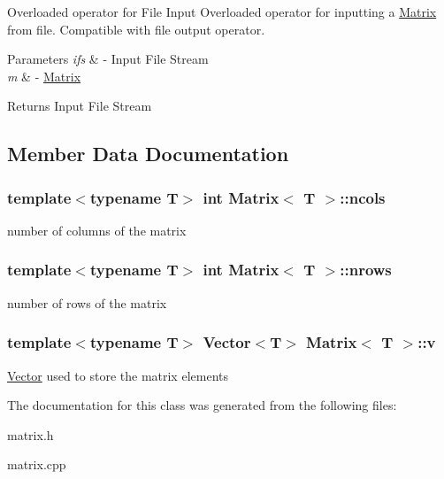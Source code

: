 Overloaded operator for File Input Overloaded operator for inputting a \hyperlink{class_matrix}{Matrix} from file. Compatible with file output operator. 


\begin{DoxyParams}{Parameters}
{\em ifs} & -\/ Input File Stream \\
\hline
{\em m} & -\/ \hyperlink{class_matrix}{Matrix} \\
\hline
\end{DoxyParams}
\begin{DoxyReturn}{Returns}
Input File Stream 
\end{DoxyReturn}


\subsection{Member Data Documentation}
\hypertarget{class_matrix_a30b634d02c22a903661761ef74189ae0}{
\subsubsection[{ncols}]{\setlength{\rightskip}{0pt plus 5cm}template$<$typename T$>$ int {\bf Matrix}$<$ T $>$\-::ncols\hspace{0.3cm}{\ttfamily [protected]}}}\label{class_matrix_a30b634d02c22a903661761ef74189ae0}
number of columns of the matrix \hypertarget{class_matrix_adaa4451e47cf953a563db25d155acbcc}{
\subsubsection[{nrows}]{\setlength{\rightskip}{0pt plus 5cm}template$<$typename T$>$ int {\bf Matrix}$<$ T $>$\-::nrows\hspace{0.3cm}{\ttfamily [protected]}}}\label{class_matrix_adaa4451e47cf953a563db25d155acbcc}
number of rows of the matrix \hypertarget{class_matrix_a7b1d6b09f3f6fff47c03f63a51a93cd7}{
\subsubsection[{v}]{\setlength{\rightskip}{0pt plus 5cm}template$<$typename T$>$ {\bf Vector}$<$T$>$ {\bf Matrix}$<$ T $>$\-::v\hspace{0.3cm}{\ttfamily [protected]}}}\label{class_matrix_a7b1d6b09f3f6fff47c03f63a51a93cd7}
\hyperlink{class_vector}{Vector} used to store the matrix elements 

The documentation for this class was generated from the following files\-:\begin{DoxyCompactItemize}
\item 
matrix.\-h\item 
matrix.\-cpp\end{DoxyCompactItemize}
